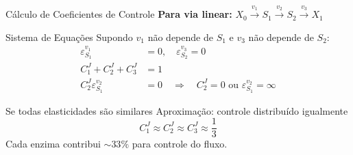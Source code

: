 \begin{frame}[shrink=25]{Cálculo de Coeficientes de Controle}
\textbf{Para via linear:} $X_0 \xrightarrow{v_1} S_1 \xrightarrow{v_2} S_2 \xrightarrow{v_3} X_1$

\vspace{0.3cm}

\begin{block}{Sistema de Equações}
Supondo $v_1$ não depende de $S_1$ e $v_3$ não depende de $S_2$:
\begin{align*}
\varepsilon_{S_1}^{v_1} &= 0, \quad \varepsilon_{S_2}^{v_3} = 0\\
C_1^J + C_2^J + C_3^J &= 1\\
C_2^J \varepsilon_{S_1}^{v_2} &= 0 \quad \Rightarrow \quad C_2^J = 0 \text{ ou } \varepsilon_{S_1}^{v_2} = \infty
\end{align*}
\end{block}

\vspace{0.3cm}

\begin{exampleblock}{Se todas elasticidades são similares}
Aproximação: controle distribuído igualmente
\begin{equation*}
C_1^J \approx C_2^J \approx C_3^J \approx \frac{1}{3}
\end{equation*}
Cada enzima contribui $\sim 33\%$ para controle do fluxo.
\end{exampleblock}
\end{frame}

